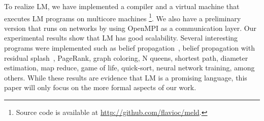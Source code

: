 To realize LM, we have implemented a compiler and a virtual machine that executes LM programs on multicore machines
\footnote{Source code is available at \url{http://github.com/flavioc/meld}.}. We also have a preliminary version that runs on networks by
using OpenMPI as a communication layer. Our experimental results show that LM has good scalability.
Several interesting programs were implemented such as belief propagation~\cite{Gonzalez+al:aistats09paraml},
belief propagation with residual splash~\cite{Gonzalez+al:aistats09paraml}, PageRank, graph coloring,
N queens, shortest path, diameter estimation, map reduce, game of life, quick-sort, neural network training, among others.
While these results are evidence that LM is a promising language, this paper will only focus on the more formal aspects of our work.